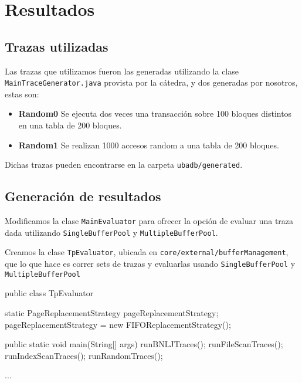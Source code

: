 \section{Resultados}


\vspace*{0.3cm}

\subsection{Trazas utilizadas}

Las trazas que utilizamos fueron las generadas utilizando la
clase \texttt{MainTraceGenerator.java} provista por la cátedra,
y dos generadas por nosotros, estas son:

\begin{itemize}
    \item
            \textbf{Random0}
            Se ejecuta dos veces una transacci\'on sobre 100 bloques
            distintos en una tabla de 200 bloques.
            
    \item
            \textbf{Random1}
            Se realizan 1000 accesos random a una tabla de 200 bloques.

\end{itemize}

Dichas trazas pueden encontrarse en la carpeta 
\texttt{ubadb/generated}.


\subsection{Generación de resultados}

Modificamos la clase \texttt{MainEvaluator} para ofrecer la opción de
evaluar una traza dada utilizando \texttt{SingleBufferPool}
y \texttt{MultipleBufferPool}. 

\vspace*{0.5cm}

Creamos la clase \texttt{TpEvaluator}, ubicada en
\texttt{core/external/bufferManagement}, que lo que hace es
correr sets de trazas y evaluarlas usando \texttt{SingleBufferPool}
y \texttt{MultipleBufferPool}

\begin{verbatimtab}[4]
public class TpEvaluator 
{
	static PageReplacementStrategy pageReplacementStrategy;
	pageReplacementStrategy = new FIFOReplacementStrategy();

	public static void main(String[] args)
	{
		runBNLJTraces();
		runFileScanTraces();
		runIndexScanTraces();		
		runRandomTraces();
	}

	...
}
\end{verbatimtab}

